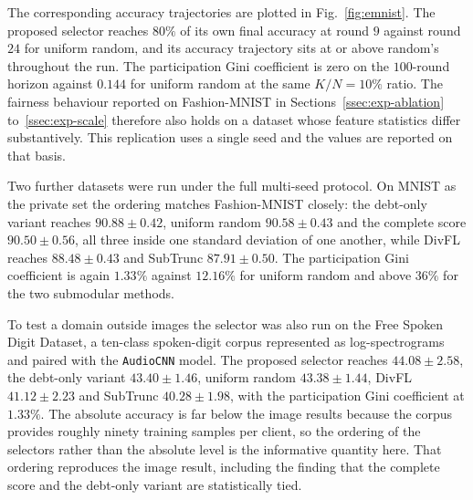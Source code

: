 \documentclass[journal]{IEEEtran}
\newcommand{\new}[1]{#1}
\newcommand{\rev}[1]{#1}
\begin{document}
\new{The corresponding accuracy trajectories are plotted in Fig.~\ref{fig:emnist}. \rev{The proposed selector reaches $80\%$ of its own final accuracy at round $9$ against round $24$ for uniform random, and its accuracy trajectory sits at or above random's throughout the run. The participation Gini coefficient is zero on the $100$-round horizon against $0.144$ for uniform random at the same $K/N = 10\%$ ratio. The fairness behaviour reported on Fashion-MNIST in Sections~\ref{ssec:exp-ablation} to~\ref{ssec:exp-scale} therefore also holds on a dataset whose feature statistics differ substantively. This replication uses a single seed and the values are reported on that basis.}}

\rev{Two further datasets were run under the full multi-seed protocol. On MNIST as the private set the ordering matches Fashion-MNIST closely: the debt-only variant reaches $90.88 \pm 0.42$, uniform random $90.58 \pm 0.43$ and the complete score $90.50 \pm 0.56$, all three inside one standard deviation of one another, while DivFL reaches $88.48 \pm 0.43$ and SubTrunc $87.91 \pm 0.50$. The participation Gini coefficient is again $1.33\%$ against $12.16\%$ for uniform random and above $36\%$ for the two submodular methods.

To test a domain outside images the selector was also run on the Free Spoken Digit Dataset, a ten-class spoken-digit corpus represented as log-spectrograms and paired with the \texttt{AudioCNN} model. The proposed selector reaches $44.08 \pm 2.58$, the debt-only variant $43.40 \pm 1.46$, uniform random $43.38 \pm 1.44$, DivFL $41.12 \pm 2.23$ and SubTrunc $40.28 \pm 1.98$, with the participation Gini coefficient at $1.33\%$. The absolute accuracy is far below the image results because the corpus provides roughly ninety training samples per client, so the ordering of the selectors rather than the absolute level is the informative quantity here. That ordering reproduces the image result, including the finding that the complete score and the debt-only variant are statistically tied.}
\end{document}

